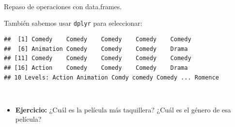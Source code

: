 \documentclass[
  9pt,
  ignorenonframetext,
]{beamer}
\newenvironment{Shaded}{\begin{snugshade}}{\end{snugshade}}
\newcommand{\CommentTok}[1]{\textcolor[rgb]{0.56,0.35,0.01}{\textit{#1}}}
\newcommand{\DecValTok}[1]{\textcolor[rgb]{0.00,0.00,0.81}{#1}}
\newcommand{\KeywordTok}[1]{\textcolor[rgb]{0.13,0.29,0.53}{\textbf{#1}}}
\newcommand{\NormalTok}[1]{#1}
\newcommand{\OperatorTok}[1]{\textcolor[rgb]{0.81,0.36,0.00}{\textbf{#1}}}
\newcommand{\StringTok}[1]{\textcolor[rgb]{0.31,0.60,0.02}{#1}}
\providecommand{\tightlist}{%
  \setlength{\itemsep}{0pt}\setlength{\parskip}{0pt}}
\begin{document}
\begin{frame}[fragile]
\begin{block}{Repaso de operaciones con data.frames.}
\begin{itemize}
  También sabemos usar \texttt{dplyr} para seleccionar: \scriptsize

\begin{Shaded}
\end{Shaded}

\begin{verbatim}
##  [1] Comedy    Comedy    Comedy    Comedy    Comedy   
##  [6] Animation Comedy    Comedy    Comedy    Drama    
## [11] Comedy    Comedy    Comedy    Comedy    Comedy   
## [16] Action    Comedy    Comedy    Comedy    Drama    
## 10 Levels: Action Animation Comdy comedy Comedy ... Romence
\end{verbatim}
\end{itemize}

\normalsize \({ }\)

\begin{itemize}
\tightlist
\item
  \textbf{Ejercicio:} ¿Cuál es la película más taquillera? ¿Cuál es el
  género de esa película?
\end{itemize}

\end{block}

\end{frame}
\end{document}
